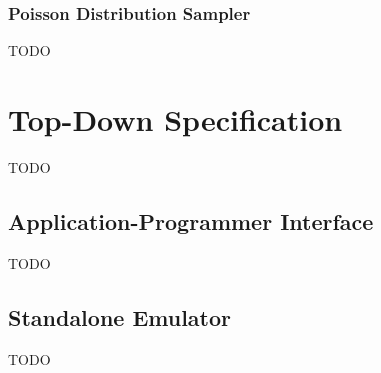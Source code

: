 \subsubsection{Poisson Distribution Sampler}

TODO


\section{Top-Down Specification}

TODO

\subsection{Application-Programmer Interface}

TODO

\subsection{Standalone Emulator}

TODO

